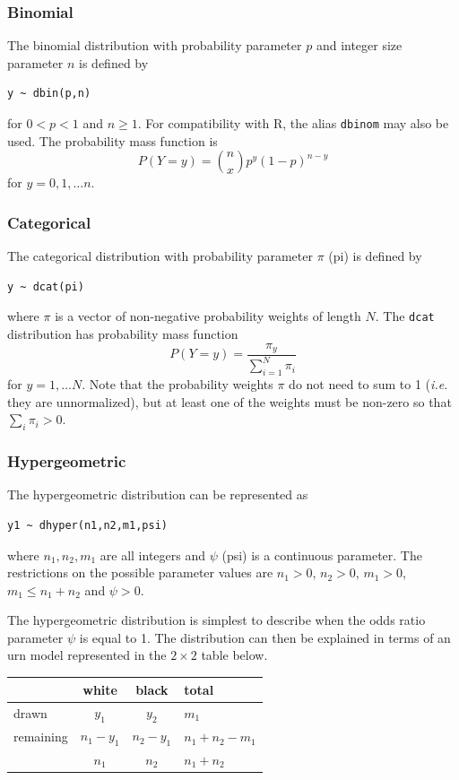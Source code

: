 \documentclass[11pt, a4paper, titlepage]{report}
\newcommand{\R}{\textsf{R}}
\begin{document}
\subsubsection{Binomial}
\label{bugs:dbin}

The binomial distribution with probability parameter $p$ and integer
size parameter $n$ is defined by
\begin{verbatim}
y ~ dbin(p,n)
\end{verbatim}
for $0 < p < 1$ and $n \geq 1$. For compatibility with \R, the alias
\texttt{dbinom} may also be used. The probability mass function is
\[
P(Y=y) = {n \choose x}  p^y (1-p)^{n-y}
\]
for $y = 0, 1, \ldots n$.

\subsubsection{Categorical}

The categorical distribution with probability parameter $\pi$ (pi) is
defined by
\begin{verbatim}
y ~ dcat(pi)
\end{verbatim}
where $\pi$ is a vector of non-negative probability weights of
length $N$. The \texttt{dcat} distribution has probability mass
function
\[
P(Y=y) = \frac{\pi_y}{\sum_{i=1}^N \pi_i}
\]
for $y = 1, \ldots N$. Note that the probability weights $\pi$ do not
need to sum to 1 ({\em i.e.} they are unnormalized), but at least one
of the weights must be non-zero so that $\sum_i \pi_i > 0$.

\subsubsection{Hypergeometric}
\label{bugs:dhyper}

The hypergeometric distribution can be represented as
\begin{verbatim}
y1 ~ dhyper(n1,n2,m1,psi)
\end{verbatim}
where $n_1, n_2, m_1$ are all integers and $\psi$ (psi) is a continuous
parameter. The restrictions on the possible parameter values are
$n_1 > 0$, $n_2 > 0$, $m_1 > 0$, $m_1 \leq n_1 + n_2$ and $\psi > 0$.

The hypergeometric distribution is simplest to describe when the odds
ratio parameter $\psi$ is equal to 1. The distribution can then be
explained in terms of an urn model represented in the $2 \times 2$
table below.

\begin{center}
\begin{tabular}{l|cc|l}
   & white & black & total \\
  \hline
  drawn    & $y_1$ & $y_2$ & $m_1$ \\
  remaining & $n_1 - y_1$  & $n_2 - y_1$  & $n_1 + n_2 - m_1$ \\
  \hline
  & $n_1$ & $n_2$ & $n_1 + n_2$ \\
\end{tabular}
\end{center}
  
\end{document}
